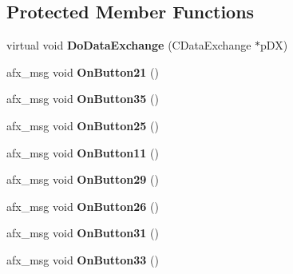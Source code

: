 \subsection*{Protected Member Functions}
\begin{DoxyCompactItemize}
\item 
\hypertarget{class_c_frag_coll_tab_aa12814c84cefddd16ccf329be5ba7056}{virtual void {\bfseries Do\-Data\-Exchange} (C\-Data\-Exchange $\ast$p\-D\-X)}\label{class_c_frag_coll_tab_aa12814c84cefddd16ccf329be5ba7056}

\item 
\hypertarget{class_c_frag_coll_tab_ab55a826d17c35df05ae8ee37d0a30535}{afx\-\_\-msg void {\bfseries On\-Button21} ()}\label{class_c_frag_coll_tab_ab55a826d17c35df05ae8ee37d0a30535}

\item 
\hypertarget{class_c_frag_coll_tab_a449d298a9a667ee94305a9a44c5e6ac4}{afx\-\_\-msg void {\bfseries On\-Button35} ()}\label{class_c_frag_coll_tab_a449d298a9a667ee94305a9a44c5e6ac4}

\item 
\hypertarget{class_c_frag_coll_tab_a90a24d1391cb445cadad15dccfb969f2}{afx\-\_\-msg void {\bfseries On\-Button25} ()}\label{class_c_frag_coll_tab_a90a24d1391cb445cadad15dccfb969f2}

\item 
\hypertarget{class_c_frag_coll_tab_a58f4fc5de5cc1ad09014a93a39be6736}{afx\-\_\-msg void {\bfseries On\-Button11} ()}\label{class_c_frag_coll_tab_a58f4fc5de5cc1ad09014a93a39be6736}

\item 
\hypertarget{class_c_frag_coll_tab_a5c95ee647ce7a09714054401a6735a7d}{afx\-\_\-msg void {\bfseries On\-Button29} ()}\label{class_c_frag_coll_tab_a5c95ee647ce7a09714054401a6735a7d}

\item 
\hypertarget{class_c_frag_coll_tab_a7249ddd2267790526c58cfd1d795b97e}{afx\-\_\-msg void {\bfseries On\-Button26} ()}\label{class_c_frag_coll_tab_a7249ddd2267790526c58cfd1d795b97e}

\item 
\hypertarget{class_c_frag_coll_tab_a71d44aa19306c63c63a6b16eedf2347d}{afx\-\_\-msg void {\bfseries On\-Button31} ()}\label{class_c_frag_coll_tab_a71d44aa19306c63c63a6b16eedf2347d}

\item 
\hypertarget{class_c_frag_coll_tab_af3486423a9942d2e1337f40b067ce26c}{afx\-\_\-msg void {\bfseries On\-Button33} ()}\label{class_c_frag_coll_tab_af3486423a9942d2e1337f40b067ce26c}


\end{DoxyCompactItemize}
